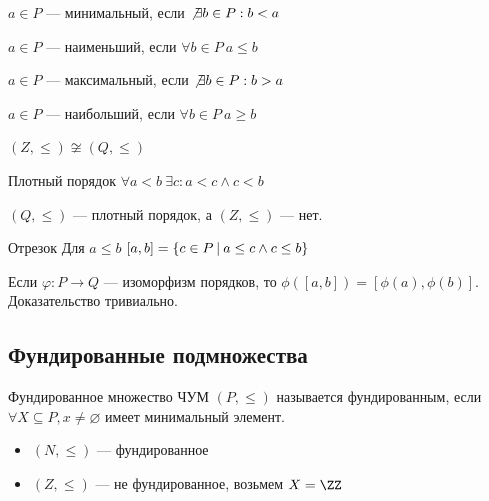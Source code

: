 \begin{defn}{}{}
    \( a \in P \) --- минимальный, если \( \not\exists b \in P : b < a \)

    \( a \in P \) --- наименьший, если \( \forall b \in P \ a \leq b \)

    \( a \in P \) --- максимальный, если \( \not\exists b \in P : b > a \)

    \( a \in P \) --- наибольший, если \( \forall b \in P \ a \geq b \)
\end{defn}

\begin{example}{}{}
    \( (Z, \leq) \not\cong (Q, \leq) \)
\end{example}

\begin{defn}{Плотный порядок}{}
    \( \forall a < b \ \exists c : a < c \land c < b \)
\end{defn}

\( (Q, \leq) \) --- плотный порядок, а \( (Z, \leq) \) --- нет.

\begin{defn}{Отрезок}{}
    Для \( a \leq b \) \( [a, b] = \{ c \in P \ \vline \ a \leq c \land c \leq b \} \)
\end{defn}

Если \( \varphi: P \to Q \) --- изоморфизм порядков, то \( \phi([a, b]) = [\phi(a), \phi(b)] \).
Доказательство тривиально.

\newpage

\subsection{Фундированные подмножества}

\begin{defn}{Фундированное множество}{}
    ЧУМ \( (P, \leq) \) называется фундированным, если \( \forall X \subseteq P, x \neq \varnothing \)
    имеет минимальный элемент.
\end{defn}

\begin{example}{}{}
    \begin{itemize}
        \item
            \( (N, \leq) \) --- фундированное
        \item
            \( (Z, \leq) \) --- не фундированное, возьмем \( X = \ZZ \)
    \end{itemize}
\end{example}

